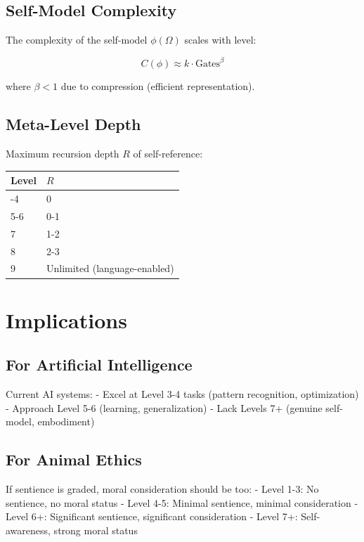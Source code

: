 \documentclass[
  11pt,
  letterpaper,
  twoside,
  openright]{book}
\begin{document}
\subsection{Self-Model Complexity}\label{self-model-complexity}

The complexity of the self-model \(\phi(\Omega)\) scales with level:

\[C(\phi) \approx k \cdot \text{Gates}^{\beta}\]

where \(\beta < 1\) due to compression (efficient representation).

\subsection{Meta-Level Depth}\label{meta-level-depth}

Maximum recursion depth \(R\) of self-reference:

\begin{longtable}[]{@{}ll@{}}
\toprule\noalign{}
Level & \(R\) \\
\midrule\noalign{}
\endhead
\bottomrule\noalign{}
\endlastfoot
0-4 & 0 \\
5-6 & 0-1 \\
7 & 1-2 \\
8 & 2-3 \\
9 & Unlimited (language-enabled) \\
\end{longtable}

\section{Implications}\label{implications-3}

\subsection{For Artificial
Intelligence}\label{for-artificial-intelligence}

Current AI systems: - Excel at Level 3-4 tasks (pattern recognition,
optimization) - Approach Level 5-6 (learning, generalization) - Lack
Levels 7+ (genuine self-model, embodiment)

\subsection{For Animal Ethics}\label{for-animal-ethics}

If sentience is graded, moral consideration should be too: - Level 1-3:
No sentience, no moral status - Level 4-5: Minimal sentience, minimal
consideration - Level 6+: Significant sentience, significant
consideration - Level 7+: Self-awareness, strong moral status
\end{document}
